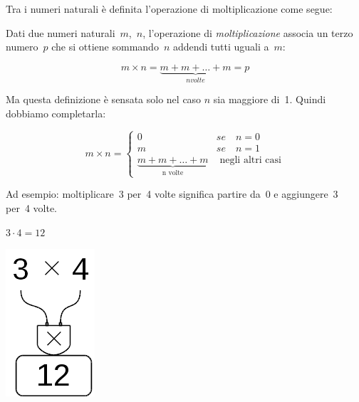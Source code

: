 Tra i numeri naturali è definita l'operazione di moltiplicazione come segue:

\begin{definizione}
Dati due numeri naturali~$m$,~$n$, l'operazione di \emph{moltiplicazione} 
associa un terzo numero~$p$ che si ottiene sommando~$n$ addendi tutti uguali 
a~$m$:

\begin{inaccessibleblock}[
$$m \times n = \mbox{n volte}{(m + m + \dots + m)} = p$$
]
$$m \times n = \underbrace{m + m + \dots + m}_{n volte} = p$$
\end{inaccessibleblock}
\end{definizione}

Ma questa definizione è sensata solo nel caso $n$ sia maggiore di~1.
Quindi dobbiamo completarla:

\begin{inaccessibleblock}[
\begin{definizione}
$$
m \times n = \begin{cases}
 0 & se \quad n = 0\\
 m & se \quad n = 1\\
 \mbox{n volte}{(m + m + \dots + m)} & \mbox{ negli altri casi}
\end{cases}$$
\end{definizione}
]
\begin{definizione}
$$
m \times n = \begin{cases}
 0 & se \quad n = 0\\
 m & se \quad n = 1\\
 \underbrace{m + m + \dots + m}_{\text{n volte}} & \mbox{ negli altri casi}
\end{cases}$$
\end{definizione}
\end{inaccessibleblock}

Ad esempio: moltiplicare~3 per~4 volte significa partire da~0 e aggiungere~3 
per~4 volte.

\begin{minipage}{0.80\textwidth}
 \centering
 $3 \cdot 4 = 12$

% 
\end{minipage}%
\begin{minipage}{0.15\textwidth}
 \centering
\begin{inaccessibleblock}[]
 \includegraphics[scale=0.35]{img/op_mol.png}
\end{inaccessibleblock}
\end{minipage}%

